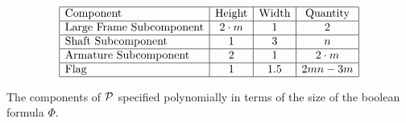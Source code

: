 \begin{center}
	\begin{table}\label{TBL:HingedPolygonsV3-1}
		$$\begin{array}{|l|c|c|c|}%
		 \hline
		 \text{Component} & \text{Height} & \text{Width} & \text{Quantity}\\\hline
		 \text{Large Frame Subcomponent} & 2\cdot m & 1 & 2\\\hline
		 \text{Shaft Subcomponent} & 1 & 3 & n\\\hline
		 \text{Armature Subcomponent} & 2 & 1 & 2\cdot m\\\hline
		 \text{Flag} & 1 & 1.5 & 2mn-3m\\\hline
		\end{array}$$
		\caption{The components of ${\cal P}$ specified polynomially in terms of the size of the boolean formula $\Phi$.}
	\end{table}
\end{center}

